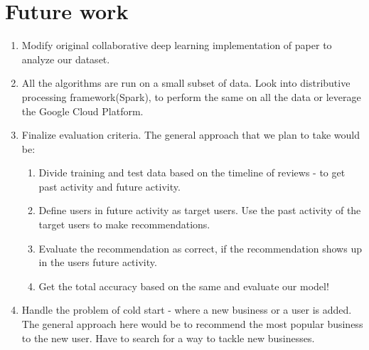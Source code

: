 \documentclass[11pt]{article}
\begin{document}
	
	
	\section{Future work}
	\begin{enumerate}
		\item Modify original collaborative deep learning implementation\cite{cdli} of paper \cite{cdl} to analyze our dataset.
		\item All the algorithms are run on a small subset of data. Look into distributive processing framework(Spark), to perform the same on all the data or leverage the Google Cloud Platform.
		\item Finalize evaluation criteria. The general approach that we plan to take would be:
		\begin{enumerate}
			\item Divide training and test data based on the timeline of reviews - to get past activity and future activity.
			\item Define users in future activity as target users. Use the past activity of the target users to make recommendations.
			\item Evaluate the recommendation as correct, if the recommendation shows up in the users future activity.
			\item Get the total accuracy based on the same and evaluate our model!
		\end{enumerate}
		\item Handle the problem of cold  start - where a new business or a user is added. The general approach here would be to recommend the most popular business to the new user. Have to search for a way to tackle new businesses.
		
	\end{enumerate}
	
\end{document}
